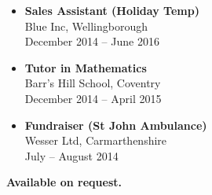 
\begin{itemize}
	\item \textbf{Sales Assistant (Holiday Temp)} \\
	Blue Inc, Wellingborough \\
	December 2014 -- June 2016
	\item \textbf{Tutor in Mathematics} \\
	Barr's Hill School, Coventry \\
	December 2014 -- April 2015
	\item \textbf{Fundraiser (St John Ambulance)} \\
	Wesser Ltd, Carmarthenshire \\
	July -- August 2014
\end{itemize}

\medskip


\normalsize \textbf{Available on request.}
